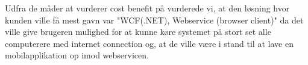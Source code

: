 Udfra de måder at vurderer cost benefit på vurderede vi, at den løsning hvor kunden ville få mest gavn var "WCF(.NET), Webservice (browser client)" da det ville give brugeren mulighed for at kunne køre systemet på stort set alle computerere med internet connection og, at de ville være i stand til at lave en mobilapplikation op imod webservicen.



 